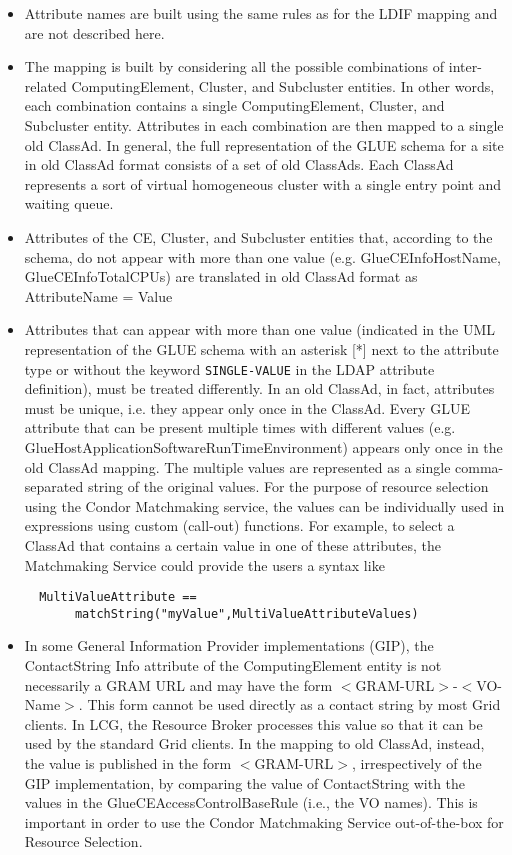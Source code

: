 \documentclass[12pt]{article}
\begin{document}
\begin{itemize}
\item Attribute names are built using the same rules as for the LDIF
mapping \cite{LDIF-mapping} and are not described here.

\item The mapping is built by considering all the possible combinations of
inter-related ComputingElement, Cluster, and Subcluster entities. In
other words, each combination contains a single ComputingElement,
Cluster, and Subcluster entity. Attributes in each combination are
then mapped to a single old ClassAd. In general, the full
representation of the GLUE schema for a site in old ClassAd format
consists of a set of old ClassAds. Each ClassAd represents a sort of
virtual homogeneous cluster with a single entry point and waiting
queue.

\item Attributes of the CE, Cluster, and Subcluster entities that,
according to the schema, do not appear with more than one value
(e.g. GlueCEInfoHostName, GlueCEInfoTotalCPUs) are translated in old
ClassAd format as AttributeName = Value

\item Attributes that can appear with more than one value (indicated in the UML
representation of the GLUE schema with an asterisk [*] next to the
attribute type or without the keyword \verb+SINGLE-VALUE+ in the
LDAP attribute definition), must be treated differently. In an old
ClassAd, in fact, attributes must be unique, i.e. they appear only
once in the ClassAd. Every GLUE attribute that can be present
multiple times with different values (e.g.
GlueHostApplicationSoftwareRunTimeEnvironment) appears only once in
the old ClassAd mapping. The multiple values are represented as a
single comma-separated string of the original values. For the
purpose of resource selection using the Condor Matchmaking service,
the values can be individually used in expressions using custom
(call-out) functions. For example, to select a ClassAd that contains
a certain value in one of these attributes, the Matchmaking Service
could provide the users a syntax like
\begin{verbatim}
  MultiValueAttribute ==
       matchString("myValue",MultiValueAttributeValues)
\end{verbatim}


\item In some General Information Provider implementations (GIP),
the ContactString Info attribute of the ComputingElement entity is
not necessarily a GRAM URL and may have the form
$<$GRAM-URL$>$-$<$VO-Name$>$. This form cannot be used directly as a
contact string by most Grid clients. In LCG, the Resource Broker
processes this value so that it can be used by the standard Grid
clients. In the mapping to old ClassAd, instead, the value is
published in the form $<$GRAM-URL$>$, irrespectively of the GIP
implementation, by comparing the value of ContactString with the
values in the GlueCEAccessControlBaseRule (i.e., the VO names). This
is important in order to use the Condor Matchmaking Service
out-of-the-box for Resource Selection.



\end{itemize}
\end{document}
